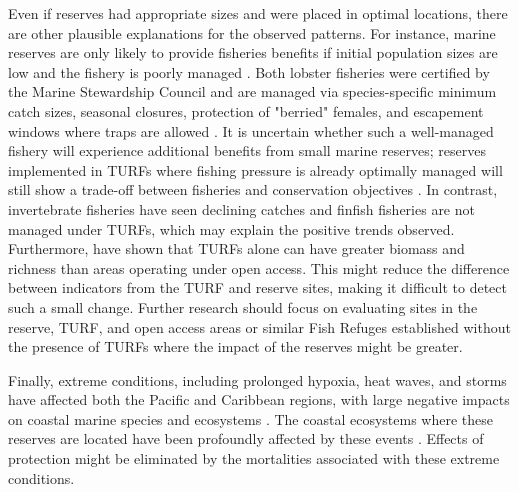 \documentclass[10pt,letterpaper]{article}
\begin{document}
Even if reserves had appropriate sizes and were placed in optimal locations, there are other plausible explanations for the observed patterns. For instance, marine reserves are only likely to provide fisheries benefits if initial population sizes are low and the fishery is poorly managed \cite{hilborn_2004,hilborn_2006}. Both lobster fisheries were certified by the Marine Stewardship Council and are managed via species-specific minimum catch sizes, seasonal closures, protection of "berried" females, and escapement windows where traps are allowed \cite{dof_website_1993}. It is uncertain whether such a well-managed fishery will experience additional benefits from small marine reserves; reserves implemented in TURFs where fishing pressure is already optimally managed will still show a trade-off between fisheries and conservation objectives \cite{lester_2017}. In contrast, invertebrate fisheries have seen declining catches and finfish fisheries are not managed under TURFs, which may explain the positive trends observed. Furthermore, \cite{gelcich_2008} have shown that TURFs alone can have greater biomass and richness than areas operating under open access. This might reduce the difference between indicators from the TURF and reserve sites, making it difficult to detect such a small change. Further research should focus on evaluating sites in the reserve, TURF, and open access areas or similar Fish Refuges established without the presence of TURFs where the impact of the reserves might be greater.

Finally, extreme conditions, including prolonged hypoxia, heat waves, and storms have affected both the Pacific and Caribbean regions, with large negative impacts on coastal marine species and ecosystems \cite{cavole_2016,hughes_2018,breitburg_2018}. The coastal ecosystems where these reserves are located have been profoundly affected by these events \cite{micheli_2012-EU,woodson_2018}. Effects of protection might be eliminated by the mortalities associated with these extreme conditions.
\end{document}
